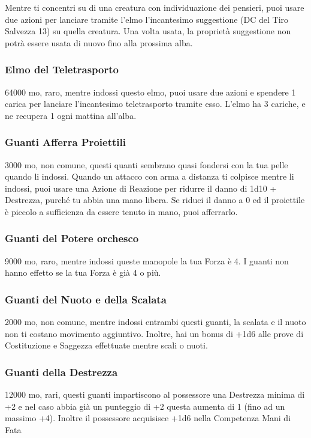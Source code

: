\begin{multicols}{2}
	Mentre ti concentri su di una creatura con individuazione dei pensieri, puoi usare due azioni per lanciare tramite l'elmo l'incantesimo suggestione (DC del Tiro Salvezza 13) su quella creatura. Una volta usata, la proprietà suggestione non potrà essere usata di nuovo fino alla prossima alba.

	\subsubsection*{Elmo del Teletrasporto}
	64000 mo, raro, mentre indossi questo elmo, puoi usare due azioni e spendere 1 carica per lanciare l'incantesimo teletrasporto tramite esso. L'elmo ha 3 cariche, e ne recupera 1 ogni mattina all'alba.

	\subsubsection*{Guanti Afferra Proiettili}
	3000 mo, non comune, questi quanti sembrano quasi fondersi con la tua pelle quando li indossi. Quando un attacco con arma a distanza ti colpisce mentre li indossi, puoi usare una Azione di Reazione per ridurre il danno di 1d10 + Destrezza, purché tu abbia una mano libera. Se riduci il danno a 0 ed il proiettile è piccolo a sufficienza da essere tenuto in mano, puoi afferrarlo.

	\subsubsection*{Guanti del Potere orchesco}
	9000 mo, raro, mentre indossi queste manopole la tua Forza è 4. I guanti non hanno effetto se la tua Forza è già 4 o più.

	\subsubsection*{Guanti del Nuoto e della Scalata}
	2000 mo, non comune, mentre indossi entrambi questi guanti, la scalata e il nuoto non ti costano movimento aggiuntivo. Inoltre, hai un bonus di +1d6 alle prove di Costituzione e Saggezza effettuate mentre scali o nuoti.

	\subsubsection*{Guanti della Destrezza}
	12000 mo, rari, questi guanti impartiscono al possessore una Destrezza minima di +2 e nel caso abbia già un punteggio di +2 questa aumenta di 1 (fino ad un massimo +4). Inoltre il possessore acquisisce +1d6 nella Competenza Mani di Fata


\end{multicols}
